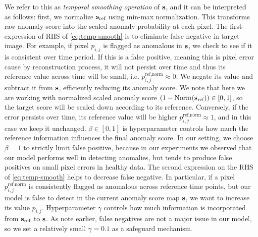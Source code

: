 We refer to this as \emph{temporal smoothing operation} of ${\mathbf{s}}$, and it can be interpreted as follows: first, we normalize ${\mathbf{s}}_{\text{ref}}$ using min-max normalization. This transforms raw anomaly score into the scaled anomaly probability at each pixel. The first expression of RHS of \cref{eq:temp-smooth} is to eliminate false negative in target image. For example, if pixel $p_{i, j}$ is flagged as anomalous in ${\mathbf{s}}$, we check to see if it is consistent over time period. If this is a false positive, meaning this is pixel error cause by reconstruction process, it will not persist over time and thus its reference value across time will be small, i.e. $p_{i, j}^{\text{ref}, \text{norm}} \approx 0$. We negate its value and subtract it from ${\mathbf{s}}$, efficiently reducing its anomaly score. We note that here we are working with normalized scaled anomaly score $(1 - \mathrm{Norm}({\mathbf{s}}_{\text{ref}})) \in [0, 1]$, so the target score will be scaled down according to its reference. Conversely, if the error persists over time, its reference value will be higher $p_{i, j}^{\text{ref}, \text{norm}} \approx 1$, and in this case we keep it unchanged. $\beta \in [0, 1]$ is hyperparameter controls how much the reference information influences the final anomaly score. In our setting, we choose $\beta = 1$ to strictly limit false positive, because in our experiments we observed that our model performs well in detecting anomalies, but tends to produce false positives on small pixel errors in healthy data. The second expression on the RHS of \cref{eq:temp-smooth} helps to decrease false negative. In particular, if a pixel $p_{i, j}^{\text{ref}, \text{norm}}$ is consistently flagged as anomalous across reference time points, but our model is false to detect in the current anomaly score map ${\mathbf{s}}$, we want to increase its value $p_{i, j}$. Hyperparameter $\gamma$ controls how much information is incorporated from ${\mathbf{s}}_{\text{ref}}$ to ${\mathbf{s}}$. As note earlier, false negatives are not a major issue in our model, so we set a relatively small $\gamma = 0.1$ as a safeguard mechanism. 

